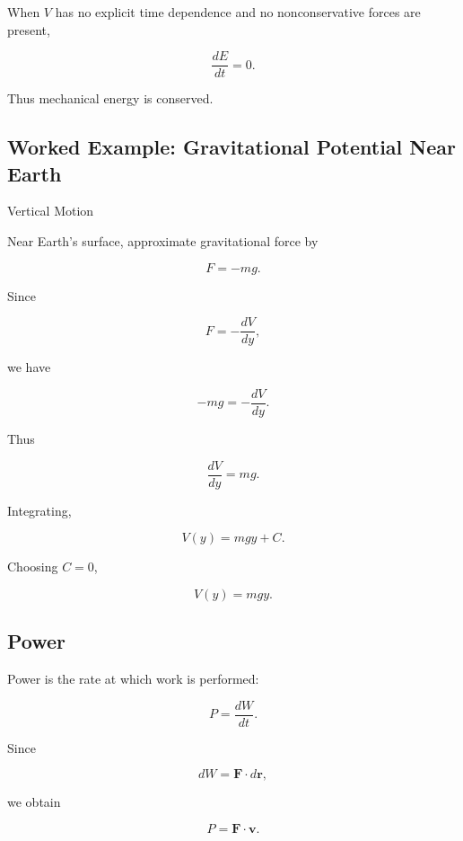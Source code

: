 When \(V\) has no explicit time dependence and no nonconservative forces are
present,

\[
\boxed{
\frac{dE}{dt}=0.
}
\]

Thus mechanical energy is conserved.

\subsection{Worked Example: Gravitational Potential Near Earth}
\label{subsec:worked-gravitational-potential}

\begin{workedexamplebox}{Vertical Motion}

Near Earth's surface, approximate gravitational force by

\[
F=-mg.
\]

Since

\[
F
=
-\frac{dV}{dy},
\]

we have

\[
-mg
=
-\frac{dV}{dy}.
\]

Thus

\[
\frac{dV}{dy}
=
mg.
\]

Integrating,

\[
V(y)=mgy+C.
\]

Choosing \(C=0\),

\begin{answerbox}
\[
\boxed{
V(y)=mgy.
}
\]
\end{answerbox}

\end{workedexamplebox}

\subsection{Power}
\label{subsec:physical-power}

Power is the rate at which work is performed:

\[
\boxed{
P
=
\frac{dW}{dt}.
}
\]

Since

\[
dW
=
\mathbf{F}\cdot d\mathbf{r},
\]

we obtain

\[
\boxed{
P
=
\mathbf{F}\cdot\mathbf{v}.
}
\]

